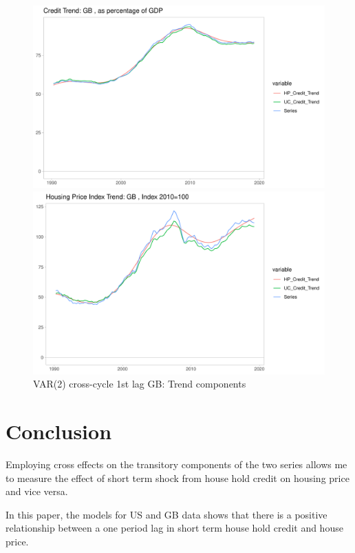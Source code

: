 \documentclass[fleqn]{article}
\begin{document}
\begin{outline}[enumerate]
		\begin{figure}[h!]
			\caption{VAR(2) cross-cycle 1st lag GB: Trend components}	
			\centerline{\includegraphics[scale=0.7]{../../Regression/VAR_2_crosscycle_1stlagonly/Output/Graphs/Credit_trend_GB.pdf}}
			\centerline{\includegraphics[scale=0.7]{../../Regression/VAR_2_crosscycle_1stlagonly/Output/Graphs/HP_trend_GB.pdf}}
		\end{figure}
		
		\clearpage
		\section{Conclusion}
		Employing cross effects on the transitory components of the two series allows me to measure the effect of short term shock from house hold credit on housing price and vice versa.
				
		In this paper, the models for US and GB data shows that there is a positive relationship between a one period lag in short term house hold credit and house price. 
		

\end{outline}
\end{document}
